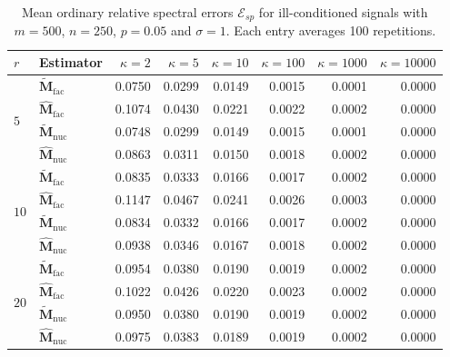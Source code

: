 \documentclass[numsec,webpdf,modern,large,namedate]{oup-authoring-template}
\theoremstyle{plain}
\theoremstyle{remark}
\newcommand{\M}{\bm{M}}
\begin{document}
\begin{table}[!htbp]
\centering
\caption{Mean ordinary relative spectral errors $\mathcal E_{sp}$ for ill-conditioned signals with $m=500$, $n=250$, $p=0.05$ and $\sigma=1$. Each entry averages 100 repetitions.}
\label{tab:supp:ill_specnorm}
\begingroup
\small
{}
\setlength{\tabcolsep}{3.2pt}
\begin{tabular}{@{}llrrrrrr@{}}
\toprule
$r$ & Estimator & $\kappa=2$ & $\kappa=5$ & $\kappa=10$ & $\kappa=100$ & $\kappa=1000$ & $\kappa=10000$ \\
\midrule
\multirow{4}{*}{$5$} & $\widetilde{\M}_{\mathrm{fac}}$ & 0.0750 & 0.0299 & 0.0149 & 0.0015 & 0.0001 & 0.0000 \\
 & $\widehat{\M}_{\mathrm{fac}}$ & 0.1074 & 0.0430 & 0.0221 & 0.0022 & 0.0002 & 0.0000 \\
 & $\widetilde{\M}_{\mathrm{nuc}}$ & 0.0748 & 0.0299 & 0.0149 & 0.0015 & 0.0001 & 0.0000 \\
 & $\widehat{\M}_{\mathrm{nuc}}$ & 0.0863 & 0.0311 & 0.0150 & 0.0018 & 0.0002 & 0.0000 \\
\midrule
\multirow{4}{*}{$10$} & $\widetilde{\M}_{\mathrm{fac}}$ & 0.0835 & 0.0333 & 0.0166 & 0.0017 & 0.0002 & 0.0000 \\
 & $\widehat{\M}_{\mathrm{fac}}$ & 0.1147 & 0.0467 & 0.0241 & 0.0026 & 0.0003 & 0.0000 \\
 & $\widetilde{\M}_{\mathrm{nuc}}$ & 0.0834 & 0.0332 & 0.0166 & 0.0017 & 0.0002 & 0.0000 \\
 & $\widehat{\M}_{\mathrm{nuc}}$ & 0.0938 & 0.0346 & 0.0167 & 0.0018 & 0.0002 & 0.0000 \\
\midrule
\multirow{4}{*}{$20$} & $\widetilde{\M}_{\mathrm{fac}}$ & 0.0954 & 0.0380 & 0.0190 & 0.0019 & 0.0002 & 0.0000 \\
 & $\widehat{\M}_{\mathrm{fac}}$ & 0.1022 & 0.0426 & 0.0220 & 0.0023 & 0.0002 & 0.0000 \\
 & $\widetilde{\M}_{\mathrm{nuc}}$ & 0.0950 & 0.0380 & 0.0190 & 0.0019 & 0.0002 & 0.0000 \\
 & $\widehat{\M}_{\mathrm{nuc}}$ & 0.0975 & 0.0383 & 0.0189 & 0.0019 & 0.0002 & 0.0000 \\
\bottomrule
\end{tabular}
\endgroup
\end{table}
\end{document}
